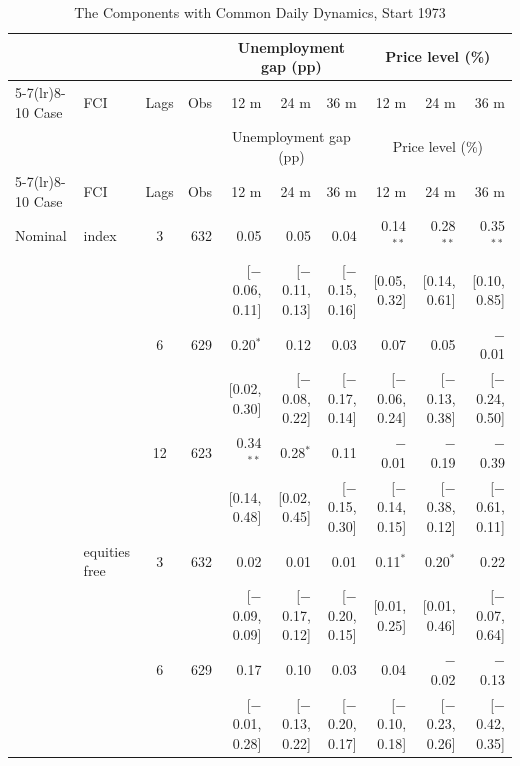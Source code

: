 \begingroup\scriptsize\setlength{\tabcolsep}{0.9pt}
\begin{longtable}{llcrrrrrrr}
\caption{The Components with Common Daily Dynamics, Start 1973}\label{tab:appR4c73}\\
\toprule
 & & & & \multicolumn{3}{c}{Unemployment gap (pp)} & \multicolumn{3}{c}{Price level (\%)}\\ \cmidrule(lr){5-7}\cmidrule(lr){8-10}
Case & FCI & Lags & Obs & 12 m & 24 m & 36 m & 12 m & 24 m & 36 m\\
\midrule\endfirsthead
\toprule
 & & & & \multicolumn{3}{c}{Unemployment gap (pp)} & \multicolumn{3}{c}{Price level (\%)}\\ \cmidrule(lr){5-7}\cmidrule(lr){8-10}
Case & FCI & Lags & Obs & 12 m & 24 m & 36 m & 12 m & 24 m & 36 m\\
\midrule\endhead
\bottomrule\endfoot
Nominal & index & 3 & 632 & 0.05 & 0.05 & 0.04 & 0.14$^{**}$ & 0.28$^{**}$ & 0.35$^{**}$\\
 & & & & {\scriptsize [$-$0.06, 0.11]} & {\scriptsize [$-$0.11, 0.13]} & {\scriptsize [$-$0.15, 0.16]} & {\scriptsize [0.05, 0.32]} & {\scriptsize [0.14, 0.61]} & {\scriptsize [0.10, 0.85]}\\
 &  & 6 & 629 & 0.20$^{*}$ & 0.12 & 0.03 & 0.07 & 0.05 & $-$0.01\\
 & & & & {\scriptsize [0.02, 0.30]} & {\scriptsize [$-$0.08, 0.22]} & {\scriptsize [$-$0.17, 0.14]} & {\scriptsize [$-$0.06, 0.24]} & {\scriptsize [$-$0.13, 0.38]} & {\scriptsize [$-$0.24, 0.50]}\\
 &  & 12 & 623 & 0.34$^{**}$ & 0.28$^{*}$ & 0.11 & $-$0.01 & $-$0.19 & $-$0.39\\
 & & & & {\scriptsize [0.14, 0.48]} & {\scriptsize [0.02, 0.45]} & {\scriptsize [$-$0.15, 0.30]} & {\scriptsize [$-$0.14, 0.15]} & {\scriptsize [$-$0.38, 0.12]} & {\scriptsize [$-$0.61, 0.11]}\\
 & equities free & 3 & 632 & 0.02 & 0.01 & 0.01 & 0.11$^{*}$ & 0.20$^{*}$ & 0.22\\
 & & & & {\scriptsize [$-$0.09, 0.09]} & {\scriptsize [$-$0.17, 0.12]} & {\scriptsize [$-$0.20, 0.15]} & {\scriptsize [0.01, 0.25]} & {\scriptsize [0.01, 0.46]} & {\scriptsize [$-$0.07, 0.64]}\\
 &  & 6 & 629 & 0.17 & 0.10 & 0.03 & 0.04 & $-$0.02 & $-$0.13\\
 & & & & {\scriptsize [$-$0.01, 0.28]} & {\scriptsize [$-$0.13, 0.22]} & {\scriptsize [$-$0.20, 0.17]} & {\scriptsize [$-$0.10, 0.18]} & {\scriptsize [$-$0.23, 0.26]} & {\scriptsize [$-$0.42, 0.35]}\\

\end{longtable}
